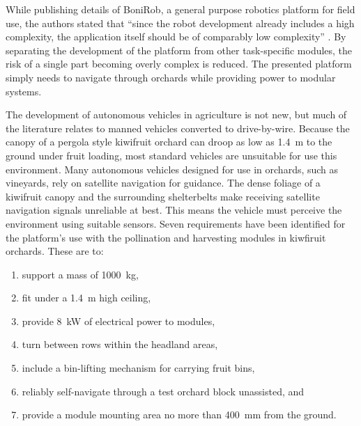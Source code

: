 \documentclass[preprint,authoryear,12pt]{elsarticle}
\begin{document}
    While publishing details of BoniRob, a general purpose robotics platform for field use, the authors stated that ``since the robot development already includes a high complexity, the application itself should be of comparably low complexity'' \citep{Ruckelshausen2009}.
    By separating the development of the platform from other task-specific modules, the risk of a single part becoming overly complex is reduced.
    The presented platform simply needs to navigate through orchards while providing power to modular systems.

    The development of autonomous vehicles in agriculture is not new, but much of the literature relates to manned vehicles converted to drive-by-wire.
    Because the canopy of a pergola style kiwifruit orchard can droop as low as \SI{1.4}{\meter} to the ground under fruit loading, most standard vehicles are unsuitable for use this environment.
    Many autonomous vehicles designed for use in orchards, such as vineyards, rely on satellite navigation for guidance.
    The dense foliage of a kiwifruit canopy and the surrounding shelterbelts make receiving satellite navigation signals unreliable at best.
    This means the vehicle must perceive the environment using suitable sensors.
    Seven requirements have been identified for the platform's use with the pollination and harvesting modules in kiwfiruit orchards.
    These are to:
    \begin{enumerate}
        \item support a mass of \SI{1000}{\kilo\gram},
        \item fit under a \SI{1.4}{\meter} high ceiling,
        \item provide \SI{8}{\kilo\watt} of electrical power to modules,
        \item turn between rows within the headland areas,
        \item include a bin-lifting mechanism for carrying fruit bins,
        \item reliably self-navigate through a test orchard block unassisted, and
        \item provide a module mounting area no more than \SI{400}{\milli\meter} from the ground.
    \end{enumerate}
\end{document}
